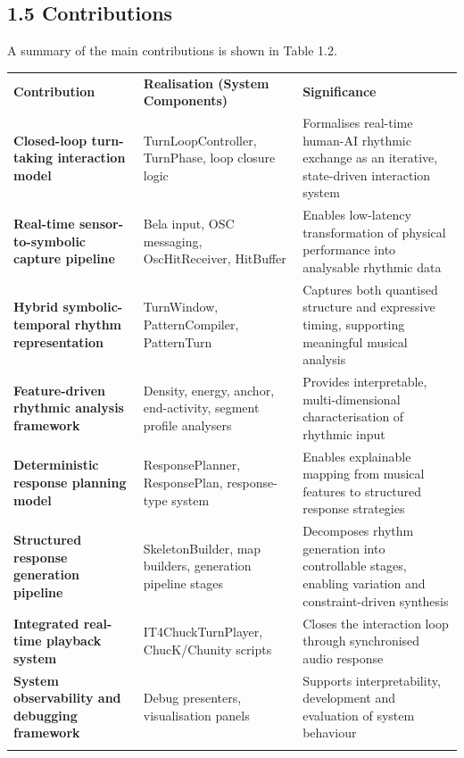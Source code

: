 \subsection{1.5 Contributions}\label{contributions}

A summary of the main contributions is shown in Table 1.2.

{\def\LTcaptype{none} %
\begin{longtable}[]{@{}lll@{}}
\toprule\noalign{}
\textbf{Contribution} & \textbf{Realisation (System Components)} &
\textbf{Significance} \\
\textbf{Closed-loop turn-taking interaction model} & TurnLoopController,
TurnPhase, loop closure logic & Formalises real-time human-AI rhythmic
exchange as an iterative, state-driven interaction system \\
\textbf{Real-time sensor-to-symbolic capture pipeline} & Bela input, OSC
messaging, OscHitReceiver, HitBuffer & Enables low-latency
transformation of physical performance into analysable rhythmic data \\
\textbf{Hybrid symbolic-temporal rhythm representation} & TurnWindow,
PatternCompiler, PatternTurn & Captures both quantised structure and
expressive timing, supporting meaningful musical analysis \\
\textbf{Feature-driven rhythmic analysis framework} & Density, energy,
anchor, end-activity, segment profile analysers & Provides
interpretable, multi-dimensional characterisation of rhythmic input \\
\textbf{Deterministic response planning model} & ResponsePlanner,
ResponsePlan, response-type system & Enables explainable mapping from
musical features to structured response strategies \\
\textbf{Structured response generation pipeline} & SkeletonBuilder, map
builders, generation pipeline stages & Decomposes rhythm generation into
controllable stages, enabling variation and constraint-driven
synthesis \\
\textbf{Integrated real-time playback system} & IT4ChuckTurnPlayer,
ChucK/Chunity scripts & Closes the interaction loop through synchronised
audio response \\
\textbf{System observability and debugging framework} & Debug
presenters, visualisation panels & Supports interpretability,
development and evaluation of system behaviour \\
\midrule\noalign{}
\endhead
\bottomrule\noalign{}
\endlastfoot
\end{longtable}
}

